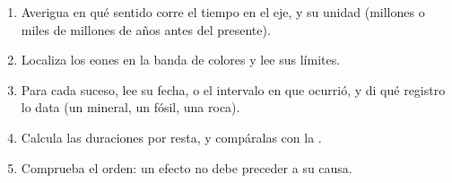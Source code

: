 \begin{method}\label{met:g12:early-earth:timeline}
\begin{enumerate}
  \item Averigua en qué sentido corre el tiempo en el eje, y su unidad
        (millones o miles de millones de años antes del presente).
  \item Localiza los eones en la banda de colores y lee sus límites.
  \item Para cada suceso, lee su fecha, o el intervalo en que ocurrió, y di
        qué registro lo data (un mineral, un fósil, una roca).
  \item Calcula las duraciones por resta, y compáralas con la .
  \item Comprueba el orden: un efecto no debe preceder a su causa.
\end{enumerate}
\end{method}

